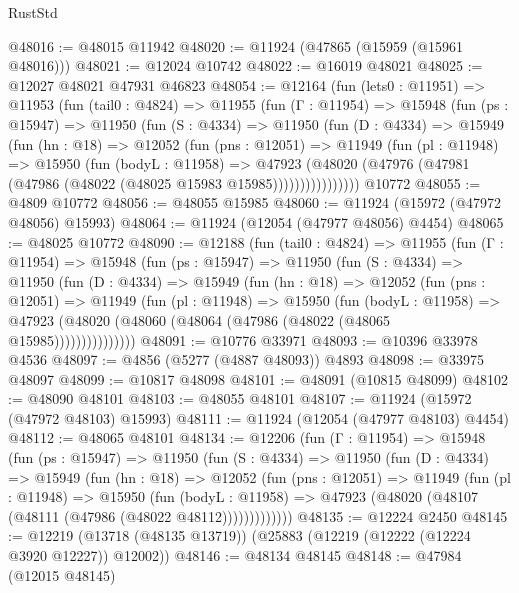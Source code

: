 \begin{lexlean}{RustStd}
\begin{coremodule}
{\begin{coremodule}
{{{{{{{{{{{{{{{{{{{{{{{{{{{{{{{{{{{{{{{{{{{{{{{{{{{{{{{{{{{{{{{{{{{{{{{{{{{{{{{{@48016 := @48015 @11942
@48020 := @11924 (@47865 (@15959 (@15961 @48016)))
@48021 := @12024 @10742
@48022 := @16019 @48021
@48025 := @12027 @48021 @47931 @46823
@48054 := @12164
    (fun (lets0 : @11951) =>
    @11953
      (fun (tail0 : @4824) =>
      @11955
        (fun (Γ : @11954) =>
        @15948
          (fun (ps : @15947) =>
          @11950
            (fun (S : @4334) =>
            @11950
              (fun (D : @4334) =>
              @15949
                (fun (hn : @18) =>
                @12052
                  (fun (pns : @12051) =>
                  @11949
                    (fun (pl : @11948) =>
                    @15950
                      (fun (bodyL : @11958) =>
                      @47923
                        (@48020
                          (@47976 (@47981 (@47986 (@48022 (@48025 @15983 @15985))))))))))))))))
    @10772
@48055 := @4809 @10772
@48056 := @48055 @15985
@48060 := @11924 (@15972 (@47972 @48056) @15993)
@48064 := @11924 (@12054 (@47977 @48056) @4454)
@48065 := @48025 @10772
@48090 := @12188
    (fun (tail0 : @4824) =>
    @11955
      (fun (Γ : @11954) =>
      @15948
        (fun (ps : @15947) =>
        @11950
          (fun (S : @4334) =>
          @11950
            (fun (D : @4334) =>
            @15949
              (fun (hn : @18) =>
              @12052
                (fun (pns : @12051) =>
                @11949
                  (fun (pl : @11948) =>
                  @15950
                    (fun (bodyL : @11958) =>
                    @47923 (@48020 (@48060 (@48064 (@47986 (@48022 (@48065 @15985)))))))))))))))
@48091 := @10776 @33971
@48093 := @10396 @33978 @4536
@48097 := @4856 (@5277 (@4887 @48093)) @4893
@48098 := @33975 @48097
@48099 := @10817 @48098
@48101 := @48091 (@10815 @48099)
@48102 := @48090 @48101
@48103 := @48055 @48101
@48107 := @11924 (@15972 (@47972 @48103) @15993)
@48111 := @11924 (@12054 (@47977 @48103) @4454)
@48112 := @48065 @48101
@48134 := @12206
    (fun (Γ : @11954) =>
    @15948
      (fun (ps : @15947) =>
      @11950
        (fun (S : @4334) =>
        @11950
          (fun (D : @4334) =>
          @15949
            (fun (hn : @18) =>
            @12052
              (fun (pns : @12051) =>
              @11949
                (fun (pl : @11948) =>
                @15950
                  (fun (bodyL : @11958) =>
                  @47923 (@48020 (@48107 (@48111 (@47986 (@48022 @48112)))))))))))))
@48135 := @12224 @2450
@48145 := @12219 (@13718 (@48135 @13719)) (@25883 (@12219 (@12222 (@12224 @3920 @12227)) @12002))
@48146 := @48134 @48145
@48148 := @47984 (@12015 @48145)
}}}}}}}}}}}}}}}}}}}}}}}}}}}}}}}}}}}}}}}}}}}}}}}}}}}}}}}}}}}}}}}}}}}}}}}}}}}}}}}}
\end{coremodule}}
\end{coremodule}
\end{lexlean}
